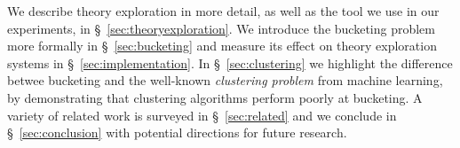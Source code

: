 We describe theory exploration in more detail, as well as the \qspec{} tool we
use in our experiments, in \S~\ref{sec:theoryexploration}. We introduce the
bucketing problem more formally in \S~\ref{sec:bucketing} and measure its
effect on theory exploration systems in \S~\ref{sec:implementation}. In
\S~\ref{sec:clustering} we highlight the difference betwee bucketing and the
well-known \emph{clustering problem} from machine learning, by demonstrating
that clustering algorithms perform poorly at bucketing.  A variety of related
work is surveyed in \S~\ref{sec:related} and we conclude in
\S~\ref{sec:conclusion} with potential directions for future research.
